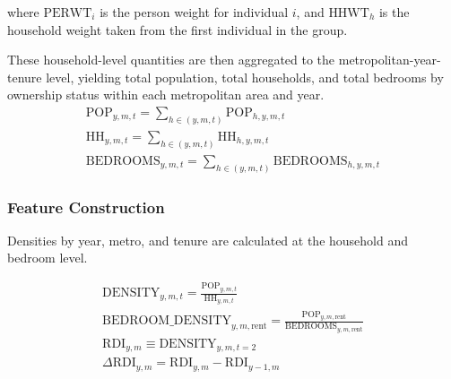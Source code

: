 \documentclass[pdflatex,sn-basic]{sn-jnl}%
\theoremstyle{thmstyleone}%
\theoremstyle{thmstyletwo}%
\theoremstyle{thmstylethree}%
\begin{document}
where \( \text{PERWT}_i \) is the person weight for individual \( i \), and \( \text{HHWT}_{h} \) is the household weight taken from the first individual in the group.

These household-level quantities are then aggregated to the metropolitan-year-tenure level, yielding total population, total households, and total bedrooms by ownership status within each metropolitan area and year.
\begin{align}
	\text{POP}_{y,m,t} = \sum_{h \in (y,m,t)} \text{POP}_{h,y,m,t}\\
	\text{HH}_{y,m,t} = \sum_{h \in (y,m,t)} \text{HH}_{h,y,m,t}\\
	\text{BEDROOMS}_{y,m,t} = \sum_{h \in (y,m,t)} \text{BEDROOMS}_{h,y,m,t}
\end{align}

\subsubsection{Feature Construction}
Densities by year, metro, and tenure are calculated at the household and bedroom level.

\begin{align}
\text{DENSITY}_{y,m,t} = \frac{\text{POP}_{y,m,t}}{\text{HH}_{y,m,t}}\\
\text{BEDROOM\_DENSITY}_{y,m,\text{rent}} =
\frac{\text{POP}_{y,m,\text{rent}}}{\text{BEDROOMS}_{y,m,\text{rent}}}\\
\text{RDI}_{y,m} \equiv \text{DENSITY}_{y,m,t=2} \\
\Delta \text{RDI}_{y,m} = \text{RDI}_{y,m} - \text{RDI}_{y-1,m}
\end{align}





\end{document}
